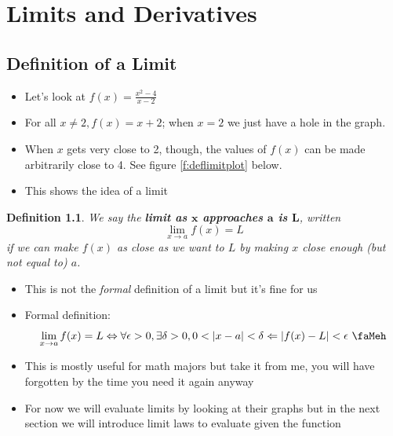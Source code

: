 \documentclass[letterpaper, 11pt, openany]{book}
\theoremstyle{mytheoremstyle}
\newtheorem{definition}{Definition}[section]
\theoremstyle{myexamplestyle}
\begin{document}
\newpage\thispagestyle{firstofchapter}
\chapter{Limits and Derivatives}
\section{Definition of a Limit}
\setcounter{figure}{0}

\begin{itemize}
    \item Let's look at $\displaystyle f(x) = \frac{x^{2} - 4}{x - 2}$
    \item For all $x \neq 2, f(x) = x + 2$; when $x = 2$ we just have a hole in the graph.
    \item When $x$ gets very close to 2, though, the values of $f(x)$ can be made arbitrarily close to 4. See figure \ref{f:deflimitplot} below.
    \item This shows the idea of a limit
\end{itemize}

\begin{definition}\label{d:limit}
    We say the \textbf{limit as $\bm{x}$ approaches $\bm{a}$ is $\bm{L}$}, written
    \[
        \lim_{x \to a} f(x) = L  
    \]
    if we can make $f(x)$ as close as we want to $L$ by making $x$ close enough (but not equal to) $a$.
\end{definition}

\begin{itemize}
    \item This is not the \textit{formal} definition of a limit but it's fine for us \faSmile
    \item Formal definition:
    \[
        \lim_{x \to a} f(x) = L \Leftrightarrow \forall \epsilon > 0, \exists \delta > 0, 0 < | x - a | < \delta \Leftarrow | f(x) - L | < \epsilon \text{ \faMeh} 
    \]
    \item This is mostly useful for math majors but take it from me, you will have forgotten by the time you need it again anyway \faSmile
    \item For now we will evaluate limits by looking at their graphs but in the next section we will introduce limit laws to evaluate given the function
\end{itemize}
\end{document}
